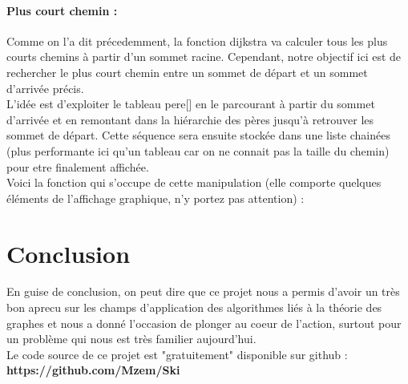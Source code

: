 \documentclass[a4]{article}
\begin{document}
			\paragraph{Plus court chemin : \\}
			Comme on l'a dit précedemment, la fonction dijkstra va calculer tous les plus courts chemins à partir d'un sommet racine. Cependant, 
			notre objectif ici est de rechercher le plus court chemin entre un sommet de départ et un sommet d'arrivée précis.\\
			L'idée est d'exploiter le tableau pere[] en le parcourant à partir du sommet d'arrivée et en remontant dans la hiérarchie des pères 
			jusqu'à retrouver les sommet de départ. Cette séquence sera ensuite stockée dans une liste chainées (plus performante ici qu'un tableau
			car on ne connait pas la taille du chemin) pour etre finalement affichée.\\
			Voici la fonction qui s'occupe de cette manipulation (elle comporte quelques éléments de l'affichage graphique, n'y portez pas attention) 
			:
			
	
			
	\section{Conclusion}
			En guise de conclusion, on peut dire que ce projet nous a permis d'avoir un très bon aprecu sur les champs d'application des algorithmes 
			liés à la théorie des graphes et nous a donné l'occasion de plonger au coeur de l'action, surtout pour un problème qui nous 
			est très familier aujourd'hui.\\
			
			Le code source de ce projet est "gratuitement" disponible sur github : \textbf{https://github.com/Mzem/Ski}
		
\end{document}
